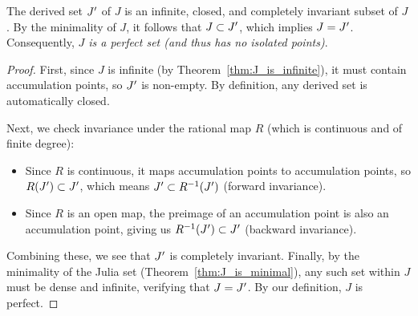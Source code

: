 \begin{proposition}
    \label{prp:J_is_perfect}
    The derived set ${J}'$ of $J$ is an infinite, closed, and completely
    invariant subset of $J$. By the minimality of $J$, it follows that $J
    \subset {J}'$, which implies $J = {J}'$. Consequently,
    \emph{$J$ is a perfect set (and thus has no isolated points)}.
\end{proposition}
\begin{proof}
    First, since $J$ is infinite (by Theorem~\ref{thm:J_is_infinite}), it must
    contain accumulation points, so ${J}'$ is non-empty. By definition,
    any derived set is automatically closed. 
    
    Next, we check invariance under the rational map $R$ (which is continuous
    and of finite degree):
    \begin{itemize}
        \item Since $R$ is continuous, it maps accumulation points to
        accumulation points, so $R({J}') \subset {J}'$, which
        means ${J}' \subset R^{-1}({J}')$ (forward invariance).
        \item Since $R$ is an open map, the preimage of an accumulation point is
        also an accumulation point, giving us $R^{-1}({J}') \subset
        {J}'$ (backward invariance).
    \end{itemize}
    Combining these, we see that ${J}'$ is completely invariant. Finally,
    by the minimality of the Julia set (Theorem~\ref{thm:J_is_minimal}), any
    such set within $J$ must be dense and infinite, verifying that $J =
    {J}'$. By our definition, $J$ is perfect.
\end{proof}

